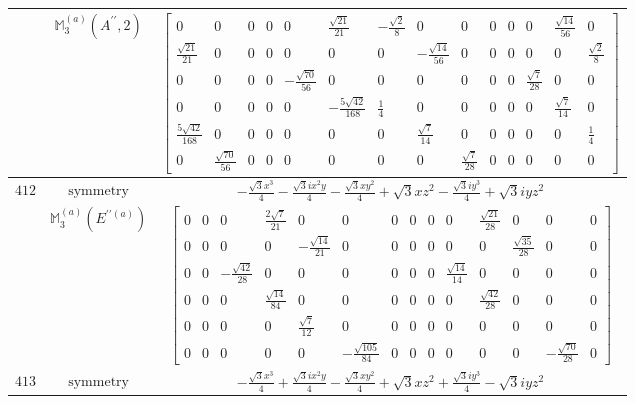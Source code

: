 \documentclass[fleqn,8pt,landscape]{jsarticle}
\begin{document}
\begin{longtable}{ccc}
$  $ & $ \mathbb{M}_{3}^{(a)}(A^{\prime\prime},2) $ & $ \begin{bmatrix} 0 & 0 & 0 & 0 & 0 & \frac{\sqrt{21}}{21} & - \frac{\sqrt{2}}{8} & 0 & 0 & 0 & 0 & 0 & \frac{\sqrt{14}}{56} & 0 \\ \frac{\sqrt{21}}{21} & 0 & 0 & 0 & 0 & 0 & 0 & - \frac{\sqrt{14}}{56} & 0 & 0 & 0 & 0 & 0 & \frac{\sqrt{2}}{8} \\ 0 & 0 & 0 & 0 & - \frac{\sqrt{70}}{56} & 0 & 0 & 0 & 0 & 0 & 0 & \frac{\sqrt{7}}{28} & 0 & 0 \\ 0 & 0 & 0 & 0 & 0 & - \frac{5 \sqrt{42}}{168} & \frac{1}{4} & 0 & 0 & 0 & 0 & 0 & \frac{\sqrt{7}}{14} & 0 \\ \frac{5 \sqrt{42}}{168} & 0 & 0 & 0 & 0 & 0 & 0 & \frac{\sqrt{7}}{14} & 0 & 0 & 0 & 0 & 0 & \frac{1}{4} \\ 0 & \frac{\sqrt{70}}{56} & 0 & 0 & 0 & 0 & 0 & 0 & \frac{\sqrt{7}}{28} & 0 & 0 & 0 & 0 & 0 \end{bmatrix} $ \\ \hline
$ 412 $ & $ \text{symmetry} $ & $ - \frac{\sqrt{3} x^{3}}{4} - \frac{\sqrt{3} i x^{2} y}{4} - \frac{\sqrt{3} x y^{2}}{4} + \sqrt{3} x z^{2} - \frac{\sqrt{3} i y^{3}}{4} + \sqrt{3} i y z^{2} $ \\
$  $ & $ \mathbb{M}_{3}^{(a)}(E^{\prime\prime(a)}) $ & $ \begin{bmatrix} 0 & 0 & 0 & \frac{2 \sqrt{7}}{21} & 0 & 0 & 0 & 0 & 0 & 0 & \frac{\sqrt{21}}{28} & 0 & 0 & 0 \\ 0 & 0 & 0 & 0 & - \frac{\sqrt{14}}{21} & 0 & 0 & 0 & 0 & 0 & 0 & \frac{\sqrt{35}}{28} & 0 & 0 \\ 0 & 0 & - \frac{\sqrt{42}}{28} & 0 & 0 & 0 & 0 & 0 & 0 & \frac{\sqrt{14}}{14} & 0 & 0 & 0 & 0 \\ 0 & 0 & 0 & \frac{\sqrt{14}}{84} & 0 & 0 & 0 & 0 & 0 & 0 & \frac{\sqrt{42}}{28} & 0 & 0 & 0 \\ 0 & 0 & 0 & 0 & \frac{\sqrt{7}}{12} & 0 & 0 & 0 & 0 & 0 & 0 & 0 & 0 & 0 \\ 0 & 0 & 0 & 0 & 0 & - \frac{\sqrt{105}}{84} & 0 & 0 & 0 & 0 & 0 & 0 & - \frac{\sqrt{70}}{28} & 0 \end{bmatrix} $ \\ \hline
$ 413 $ & $ \text{symmetry} $ & $ - \frac{\sqrt{3} x^{3}}{4} + \frac{\sqrt{3} i x^{2} y}{4} - \frac{\sqrt{3} x y^{2}}{4} + \sqrt{3} x z^{2} + \frac{\sqrt{3} i y^{3}}{4} - \sqrt{3} i y z^{2} $ \\

\end{longtable}
\end{document}
